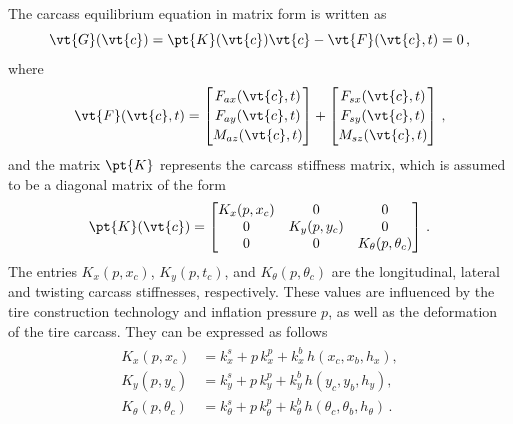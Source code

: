 The carcass equilibrium equation in matrix form is written as
%
\begin{equation}
  \vt{G}(\vt{c}) = \pt{K}(\vt{c}) \vt{c} - \vt{F}(\vt{c},t) = 0 \, \text{,}
  \label{app3:eq:nls}
\end{equation}
%
where
%
\begin{equation}
  \vt{F}(\vt{c},t) =
  \begin{bmatrix}
    F_{ax}(\vt{c},t) \\[0.2em]
    F_{ay}(\vt{c},t) \\[0.2em]
    M_{az}(\vt{c},t)
  \end{bmatrix} + \begin{bmatrix}
    F_{sx}(\vt{c},t) \\[0.2em]
    F_{sy}(\vt{c},t) \\[0.2em]
    M_{sz}(\vt{c},t)
  \end{bmatrix} \, \text{,}
\end{equation}
%
and the matrix $\pt{K}$ represents the carcass stiffness matrix, which is assumed to be a diagonal matrix of the form
%
\begin{equation}
  \pt{K}(\vt{c}) =
  \begin{bmatrix}
    K_x(p,x_c) & 0 & 0 \\
    0 & K_y(p,y_c) & 0 \\
    0 & 0 & K_\theta(p,\theta_c)
  \end{bmatrix} \, \text{.}
\end{equation}
%
The entries $K_x(p,x_c)$, $K_y(p,t_c)$, and $K_\theta(p,\theta_c)$ are the longitudinal, lateral and twisting carcass stiffnesses, respectively. These values are influenced by the tire construction technology and inflation pressure $p$, as well as the deformation of the tire carcass. They can be expressed as follows
%
\begin{equation}
  \begin{split}
    \begin{aligned}
      K_x(p,x_c)           &= k_x^s      + p \, k_x^p      + k_x^b \, h(x_c, x_b, h_x), \\
      K_y(p,y_c)           &= k_y^s      + p \, k_y^p      + k_y^b \, h(y_c, y_b, h_y), \\
      K_\theta(p,\theta_c) &= k_\theta^s + p \, k_\theta^p + k_\theta^b \, h(\theta_c, \theta_b, h_\theta) \, \text{.} \\
    \end{aligned}
  \end{split}
\end{equation}
